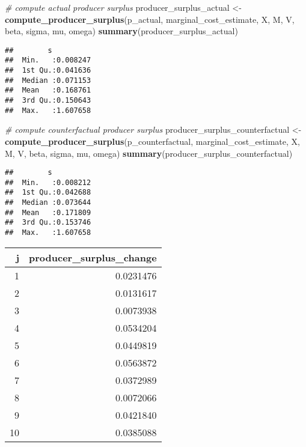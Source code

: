 \documentclass[
]{book}
\newenvironment{Shaded}{\begin{snugshade}}{\end{snugshade}}
\newcommand{\CommentTok}[1]{\textcolor[rgb]{0.56,0.35,0.01}{\textit{#1}}}
\newcommand{\KeywordTok}[1]{\textcolor[rgb]{0.13,0.29,0.53}{\textbf{#1}}}
\newcommand{\NormalTok}[1]{#1}
\newcommand{\StringTok}[1]{\textcolor[rgb]{0.31,0.60,0.02}{#1}}
\begin{document}
\begin{Shaded}
\begin{Highlighting}[]
\CommentTok{# compute actual producer surplus}
\NormalTok{producer_surplus_actual <-}
\StringTok{  }\KeywordTok{compute_producer_surplus}\NormalTok{(p_actual, marginal_cost_estimate, X, M, V, beta, sigma, mu, omega)}
\KeywordTok{summary}\NormalTok{(producer_surplus_actual)}
\end{Highlighting}
\end{Shaded}

\begin{verbatim}
##        s           
##  Min.   :0.008247  
##  1st Qu.:0.041636  
##  Median :0.071153  
##  Mean   :0.168761  
##  3rd Qu.:0.150643  
##  Max.   :1.607658
\end{verbatim}

\begin{Shaded}
\begin{Highlighting}[]
\CommentTok{# compute counterfactual producer surplus}
\NormalTok{producer_surplus_counterfactual <-}
\StringTok{  }\KeywordTok{compute_producer_surplus}\NormalTok{(p_counterfactual, marginal_cost_estimate, X, M, V, beta, sigma, mu, omega)}
\KeywordTok{summary}\NormalTok{(producer_surplus_counterfactual)}
\end{Highlighting}
\end{Shaded}

\begin{verbatim}
##        s           
##  Min.   :0.008212  
##  1st Qu.:0.042688  
##  Median :0.073644  
##  Mean   :0.171809  
##  3rd Qu.:0.153746  
##  Max.   :1.607658
\end{verbatim}

\begin{tabular}{r|r}
\hline
j & producer\_surplus\_change\\
\hline
1 & 0.0231476\\
\hline
2 & 0.0131617\\
\hline
3 & 0.0073938\\
\hline
4 & 0.0534204\\
\hline
5 & 0.0449819\\
\hline
6 & 0.0563872\\
\hline
7 & 0.0372989\\
\hline
8 & 0.0072066\\
\hline
9 & 0.0421840\\
\hline
10 & 0.0385088\\
\hline
\end{tabular}
\end{document}
